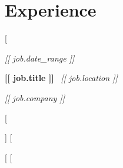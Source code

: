 \section{Experience}

[%
    \begin{twocolentry}{

    \textit{[[ job.date_range ]]}}
        \textbf{[[ job.title ]]} \textbar\ \textit{[[ job.location ]]}
        
        \textit{[[ job.company ]]}
    \end{twocolentry}

    \vspace{0.10 cm}
    \begin{onecolentry}
        \begin{highlights}
    
    [%
    \item [[ bullet ]]
    [%
        
        \end{highlights}
    \end{onecolentry}
[%
[%
